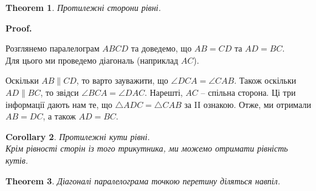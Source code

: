 \documentclass[a4paper, 10pt]{article}
\makeatletter
\theoremstyle{theoremdd}
\newtheorem{theorem}{Theorem}[subsection]
\theoremstyle{theoremdd}
\theoremstyle{theoremdd}
\theoremstyle{theoremdd}
\theoremstyle{theoremdd}
\theoremstyle{theoremdd}
\theoremstyle{theoremdd}
\theoremstyle{theoremdd}
\theoremstyle{theoremdd}
\newtheorem{corollary}[theorem]{Corollary}
\renewenvironment{proof}[1][Proof.\\]{\par
\pushQED{\hfill \qed}%
\normalfont \topsep6\p@\@plus6\p@\relax
\trivlist
\item\relax
{\bfseries
#1\@addpunct{.}}\hspace\labelsep\ignorespaces
}{%
\popQED\endtrivlist\@endpefalse
}
\makeatother
\begin{document}
\begin{theorem}
Протилежні сторони рівні.
\end{theorem}

\begin{proof}
Розглянемо паралелограм $ABCD$ та доведемо, що $AB = CD$ та $AD = BC$.\\
Для цього ми проведемо діагональ (наприклад $AC$).
\begin{figure}[H]
\centering
{}
\end{figure}
Оскільки $AB \parallel CD$, то варто зауважити, що $\angle DCA = \angle CAB$. Також оскільки $AD \parallel BC$, то звідси $\angle BCA = \angle DAC$. Нарешті, $AC$ -- спільна сторона. Ці три інформації дають нам те, що $\triangle ADC = \triangle CAB$ за II ознакою. Отже, ми отримали $AB = DC$, а також $AD = BC$.
\end{proof}

\begin{corollary}
Протилежні кути рівні.\\
\textit{Крім рівності сторін із того трикутника, ми можемо отримати рівність кутів.}
\end{corollary}

\begin{theorem}
Діагоналі паралелограма точкою перетину діляться навпіл.
\end{theorem}
\end{document}
